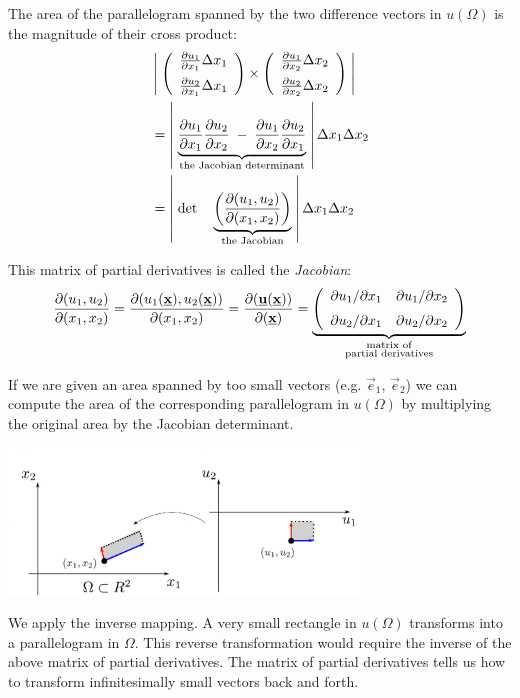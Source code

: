 The area of the parallelogram spanned by the two difference vectors in $u(\Omega)$ 
is the magnitude of their cross product:
\begin{align*}
&\left| \; 
\left( \begin{array}{rrrrrrrrrrrrrrrrrrrrrrrrrr} 
\frac{\partial u_1}{\partial x_1} \Delta x_1\\[0.2cm]
\frac{\partial u_2}{\partial x_1} \Delta x_1
\\ \end{array} \right)
\times
\left( \begin{array}{rrrrrrrrrrrrrrrrrrrrrrrrrr} 
\frac{\partial u_1}{\partial x_2} \Delta x_2\\[0.2cm]
\frac{\partial u_2}{\partial x_2} \Delta x_2
\\ \end{array} \right)
\; \right|\\ 
&=
\left| \; 
\underbrace{
\frac{\partial u_1}{\partial x_1} \frac{\partial u_2}{\partial x_2}
\; - \;
\frac{\partial u_1}{\partial x_2} \frac{\partial u_2}{\partial x_1}
}_{\text{the Jacobian determinant}}
\; \right| \Delta x_1 \Delta x_2 \\
&= 
\left| \; \det \quad
\underbrace{
\left(
\frac{\partial (u_1, u_2)}{\partial (x_1,x_2)}
\right)
}_{\text{the Jacobian}}
\; \right| \Delta x_1 \Delta x_2
\end{align*}

This matrix of partial derivatives is called the \emph{Jacobian}:
$$
\frac{\partial (u_1, u_2)}{\partial (x_1,x_2)} = 
\frac{\partial (u_1(\vec x), u_2(\vec x))}{\partial (x_1,x_2)} = 
\frac{\partial (\vec u(\vec x))}{\partial (\vec x)} =
\underbrace{
\rmat{
{\partial u_1}/{\partial x_1} & {\partial u_1}/{\partial x_2}\\[0.2cm]
{\partial u_2}/{\partial x_1} & {\partial u_2}/{\partial x_2}
}%
}_{
\substack{
\text{matrix of}\\
\text{partial derivatives}
}%
}
$$

If we are given an area spanned by too small vectors (e.g. $\vec e_1$, $\vec e_2$) 
we can compute the area of the corresponding parallelogram in $u(\Omega)$ 
by multiplying the original area by the Jacobian determinant.


\includegraphics[width=0.7\textwidth]{img/reverse.pdf}

We apply the inverse mapping. A very small rectangle in $u(\Omega)$ transforms into a parallelogram in $\Omega$. 
This reverse transformation would require the inverse of the above matrix of partial derivatives.
The matrix of partial derivatives tells us how to transform infinitesimally small vectors back and forth.

